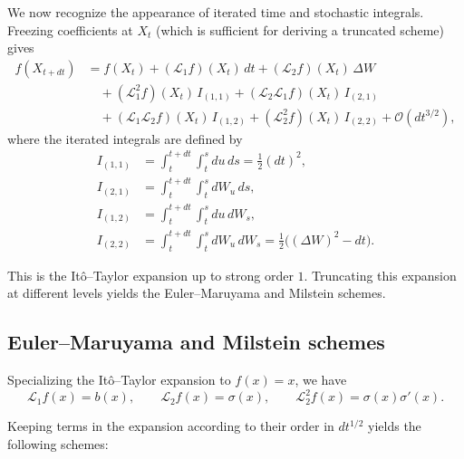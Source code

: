 \documentclass[11pt]{article}
\begin{document}
We now recognize the appearance of iterated time and stochastic integrals.  
Freezing coefficients at $X_t$ (which is sufficient for deriving a truncated scheme) gives
\begin{align}
f(X_{t+dt})
&=
f(X_t)
+
(\mathcal L_1 f)(X_t)\,dt
+
(\mathcal L_2 f)(X_t)\,\Delta W \nonumber \\
&\quad
+
(\mathcal L_1^2 f)(X_t)\, I_{(1,1)}
+
(\mathcal L_2 \mathcal L_1 f)(X_t)\, I_{(2,1)} \nonumber \\
&\quad
+
(\mathcal L_1 \mathcal L_2 f)(X_t)\, I_{(1,2)}
+
(\mathcal L_2^2 f)(X_t)\, I_{(2,2)}
+
\mathcal O(dt^{3/2}),
\end{align}
where the iterated integrals are defined by
\begin{align}
I_{(1,1)} &= \int_t^{t+dt}\!\!\int_t^{s} du\,ds = \frac12 (dt)^2, \\
I_{(2,1)} &= \int_t^{t+dt}\!\!\int_t^{s} dW_u\,ds, \\
I_{(1,2)} &= \int_t^{t+dt}\!\!\int_t^{s} du\,dW_s, \\
I_{(2,2)} &= \int_t^{t+dt}\!\!\int_t^{s} dW_u\,dW_s
= \frac12\big((\Delta W)^2 - dt\big).
\end{align}

This is the It\^{o}--Taylor expansion up to strong order $1$.  
Truncating this expansion at different levels yields the Euler--Maruyama and Milstein schemes.



\subsection*{Euler--Maruyama and Milstein schemes}

Specializing the It\^{o}--Taylor expansion to $f(x)=x$, we have
\begin{equation}
\mathcal L_1 f(x)=b(x),
\qquad
\mathcal L_2 f(x)=\sigma(x),
\qquad
\mathcal L_2^2 f(x)=\sigma(x)\sigma'(x).
\end{equation}

Keeping terms in the expansion according to their order in $dt^{1/2}$ yields the following schemes:
\end{document}
